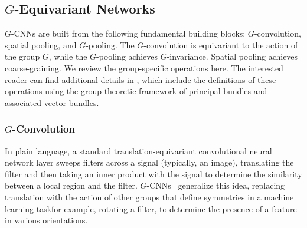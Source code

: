 

\subsection{$G$-Equivariant Networks}


$G$-CNNs are built from the following fundamental building blocks: $G$-convolution, spatial pooling, and $G$-pooling. The $G$-convolution is equivariant to the action of the group $G$, while the $G$-pooling achieves $G$-invariance. Spatial pooling achieves coarse-graining. We review the group-specific operations here. The interested reader can find additional details in \cite{cohen2016group,Cohen2019a}, which include the definitions of these operations using the group-theoretic framework of principal bundles and associated vector bundles.




\subsubsection{$G$-Convolution}

In plain language, a standard translation-equivariant convolutional neural network layer sweeps filters across a signal (typically, an image), translating the filter and then taking an inner product with the signal to determine the similarity between a local region and the filter. $G$-CNNs~\cite{cohen2016group} generalize this idea, replacing translation with the action of other groups that define symmetries in a machine learning task\textemdash for example, rotating a filter, to determine the presence of a feature in various orientations.


